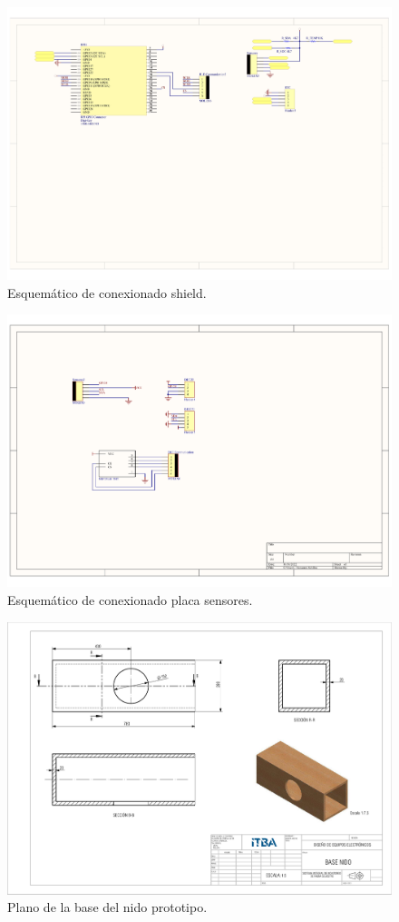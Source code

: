 
\begin{figure}[H]
	\centering
	\includegraphics[width=0.9\linewidth]{ImagenesApendice/esquematico}
	\caption{Esquem\'atico de conexionado shield.}
	\label{fig:esquematico_conexionado}
\end{figure}
\begin{figure}[H]
	\centering
	\includegraphics[width=0.9\linewidth]{ImagenesApendice/esquematicoSensores}
	\caption{Esquem\'atico de conexionado placa sensores.}
	\label{fig:esquematico_conexionado}
\end{figure}
\begin{figure}[H]
	\centering
	\includegraphics[width=\linewidth]{ImagenesApendice/Base_nido_plano}
	\caption{Plano de la base del nido prototipo.}
	\label{fig:Base_nido_plano}
\end{figure}

